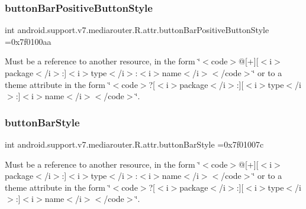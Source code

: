 \subsubsection{\texorpdfstring{button\+Bar\+Positive\+Button\+Style}{buttonBarPositiveButtonStyle}}
{\footnotesize\ttfamily int android.\+support.\+v7.\+mediarouter.\+R.\+attr.\+button\+Bar\+Positive\+Button\+Style =0x7f0100aa\hspace{0.3cm}{\ttfamily [static]}}

Must be a reference to another resource, in the form \char`\"{}$<$code$>$@\mbox{[}+\mbox{]}\mbox{[}$<$i$>$package$<$/i$>$\+:\mbox{]}$<$i$>$type$<$/i$>$\+:$<$i$>$name$<$/i$>$$<$/code$>$\char`\"{} or to a theme attribute in the form \char`\"{}$<$code$>$?\mbox{[}$<$i$>$package$<$/i$>$\+:\mbox{]}\mbox{[}$<$i$>$type$<$/i$>$\+:\mbox{]}$<$i$>$name$<$/i$>$$<$/code$>$\char`\"{}. \mbox{\label{classandroid_1_1support_1_1v7_1_1mediarouter_1_1R_1_1attr_a73eefc7ed30df5194afb425fc18de5cf}} 
\subsubsection{\texorpdfstring{button\+Bar\+Style}{buttonBarStyle}}
{\footnotesize\ttfamily int android.\+support.\+v7.\+mediarouter.\+R.\+attr.\+button\+Bar\+Style =0x7f01007c\hspace{0.3cm}{\ttfamily [static]}}

Must be a reference to another resource, in the form \char`\"{}$<$code$>$@\mbox{[}+\mbox{]}\mbox{[}$<$i$>$package$<$/i$>$\+:\mbox{]}$<$i$>$type$<$/i$>$\+:$<$i$>$name$<$/i$>$$<$/code$>$\char`\"{} or to a theme attribute in the form \char`\"{}$<$code$>$?\mbox{[}$<$i$>$package$<$/i$>$\+:\mbox{]}\mbox{[}$<$i$>$type$<$/i$>$\+:\mbox{]}$<$i$>$name$<$/i$>$$<$/code$>$\char`\"{}. \mbox{\label{classandroid_1_1support_1_1v7_1_1mediarouter_1_1R_1_1attr_a2be1cd23c0ba57efce6daa640927dc7b}} 
